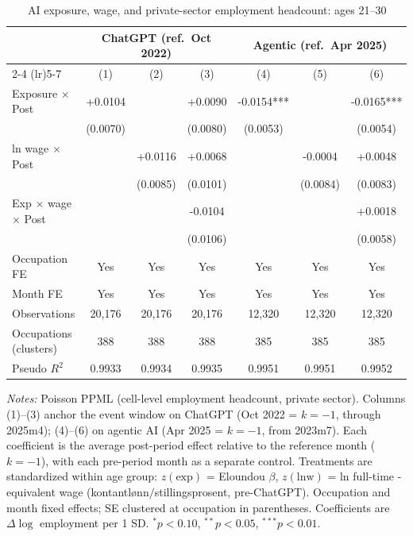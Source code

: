 \begin{table}[htbp]\centering
\caption{AI exposure, wage, and private-sector employment headcount: ages 21–30}
\label{tab:ca_did_age1}
\small
\begin{tabular}{lcccccc}
\toprule
 & \multicolumn{3}{c}{ChatGPT (ref.\ Oct 2022)} & \multicolumn{3}{c}{Agentic (ref.\ Apr 2025)} \\
\cmidrule(lr){2-4} \cmidrule(lr){5-7}
 & (1) & (2) & (3) & (4) & (5) & (6) \\
\midrule
Exposure $\times$ Post & +0.0104 &  & +0.0090 & -0.0154*** &  & -0.0165*** \\
 & (0.0070) &  & (0.0080) & (0.0053) &  & (0.0054) \\
ln wage $\times$ Post &  & +0.0116 & +0.0068 &  & -0.0004 & +0.0048 \\
 &  & (0.0085) & (0.0101) &  & (0.0084) & (0.0083) \\
Exp $\times$ wage $\times$ Post &  &  & -0.0104 &  &  & +0.0018 \\
 &  &  & (0.0106) &  &  & (0.0058) \\
\midrule
Occupation FE & Yes & Yes & Yes & Yes & Yes & Yes \\
Month FE & Yes & Yes & Yes & Yes & Yes & Yes \\
Observations & 20,176 & 20,176 & 20,176 & 12,320 & 12,320 & 12,320 \\
Occupations (clusters) & 388 & 388 & 388 & 385 & 385 & 385 \\
Pseudo $R^2$ & 0.9933 & 0.9934 & 0.9935 & 0.9951 & 0.9951 & 0.9952 \\
\bottomrule
\end{tabular}
\begin{minipage}{\linewidth}\vspace{2pt}\footnotesize
\emph{Notes:} Poisson PPML (cell-level employment headcount, private sector). Columns (1)--(3) anchor the event window on ChatGPT (Oct 2022 = $k{=}{-}1$, through 2025m4); (4)--(6) on agentic AI (Apr 2025 = $k{=}{-}1$, from 2023m7). Each coefficient is the average post-period effect relative to the reference month ($k{=}{-}1$), with each pre-period month as a separate control. Treatments are standardized within age group: $z(\text{exp})$ = Eloundou $\beta$, $z(\text{lnw})$ = ln full-time -equivalent wage (kontantl\o nn$/$stillingsprosent, pre-ChatGPT). Occupation and month fixed effects; SE clustered at occupation in parentheses. Coefficients are $\Delta\log$ employment per 1 SD. $^{*}p<0.10$, $^{**}p<0.05$, $^{***}p<0.01$.
\end{minipage}
\end{table}